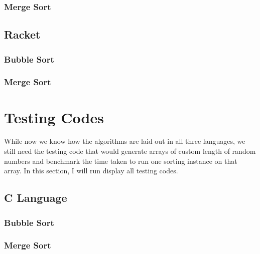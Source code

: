 \documentclass[]{report}
\begin{document}
		 		\subsubsection{Merge Sort}
		 		
		 		
		 		
		    \subsection{Racket}
		 		\subsubsection{Bubble Sort}
		 		
		 		
		 		
		 		\subsubsection{Merge Sort}
		 		
		 		
			
		\section{Testing Codes}
		While now we know how the algorithms are laid out in all three languages, we still need the testing code that would generate arrays of custom length of random numbers and benchmark the time taken to run one sorting instance on that array. In this section, I will run display all testing codes.
			\subsection{C Language}
		 		\subsubsection{Bubble Sort}
		 		
		 		
		 		
		 		\subsubsection{Merge Sort}
		 		
		 		
		 		
\end{document}
